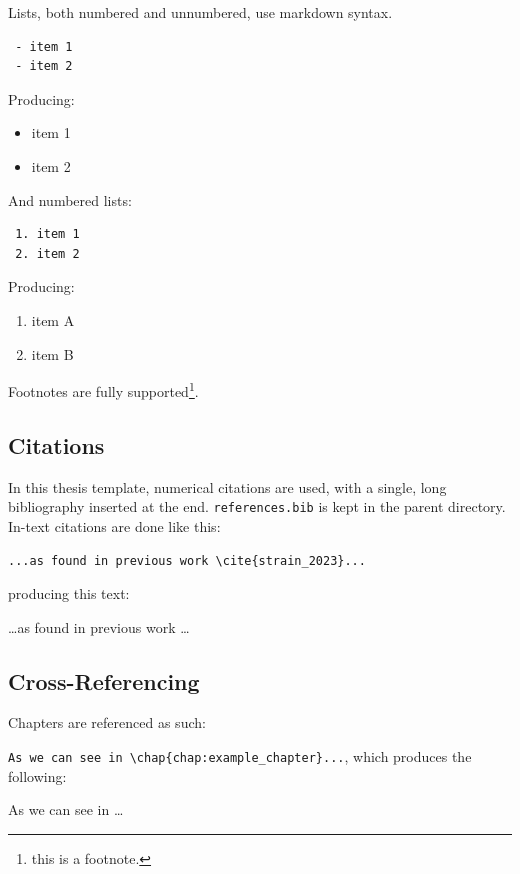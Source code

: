 \documentclass[../main.tex]{subfiles}
\begin{document}
Lists, both numbered and unnumbered, use markdown syntax.

\begin{verbatim}
 - item 1
 - item 2
\end{verbatim}

Producing:

\begin{itemize}
\tightlist
\item
  item 1
\item
  item 2
\end{itemize}

And numbered lists:

\begin{verbatim}
 1. item 1
 2. item 2
\end{verbatim}

Producing:

\begin{enumerate}
\def\labelenumi{\arabic{enumi}.}
\tightlist
\item
  item A
\item
  item B
\end{enumerate}

Footnotes are fully supported\footnote{this is a footnote.}.

\subsection{Citations}\label{citations}

In this thesis template, numerical citations are used, with a single,
long bibliography inserted at the end. \texttt{references.bib} is kept
in the parent directory. In-text citations are done like this:

\texttt{...as\ found\ in\ previous\ work\ \textbackslash{}cite\{strain\_2023\}...}

producing this text:

\ldots as found in previous work \cite{strain_2023}\ldots{}

\subsection{Cross-Referencing}\label{cross-referencing}

Chapters are referenced as such:

\texttt{As\ we\ can\ see\ in\ \textbackslash{}chap\{chap:example\_chapter\}...},
which produces the following:

As we can see in \ldots{}
\end{document}
